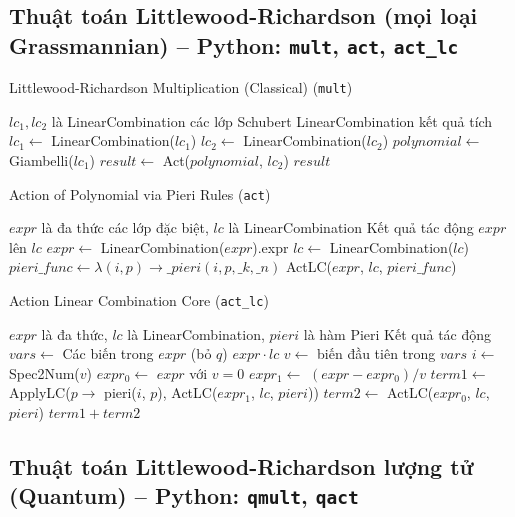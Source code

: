 
\subsection*{Thuật toán Littlewood-Richardson (mọi loại Grassmannian) -- Python: \texttt{mult}, \texttt{act}, \texttt{act\_lc}}

\begin{algorithm}[H]
\caption{Littlewood-Richardson Multiplication (Classical) (\texttt{mult})}
\begin{algorithmic}[1]
\REQUIRE $lc_1, lc_2$ là LinearCombination các lớp Schubert
\ENSURE LinearCombination kết quả tích
\STATE $lc_1 \gets$ LinearCombination($lc_1$)
\STATE $lc_2 \gets$ LinearCombination($lc_2$)
\STATE $polynomial \gets$ Giambelli($lc_1$)
\STATE $result \gets$ Act($polynomial$, $lc_2$)
\RETURN $result$
\end{algorithmic}
\end{algorithm}

\begin{algorithm}[H]
\caption{Action of Polynomial via Pieri Rules (\texttt{act})}
\begin{algorithmic}[1]
\REQUIRE $expr$ là đa thức các lớp đặc biệt, $lc$ là LinearCombination
\ENSURE Kết quả tác động $expr$ lên $lc$
\STATE $expr \gets$ LinearCombination($expr$).expr
\STATE $lc \gets$ LinearCombination($lc$)
\STATE $pieri\_func \gets \lambda(i,p) \to \_pieri(i, p, \_k, \_n)$
\RETURN ActLC($expr$, $lc$, $pieri\_func$)
\end{algorithmic}
\end{algorithm}

\begin{algorithm}[H]
\caption{Action Linear Combination Core (\texttt{act\_lc})}
\begin{algorithmic}[1]
\REQUIRE $expr$ là đa thức, $lc$ là LinearCombination, $pieri$ là hàm Pieri
\ENSURE Kết quả tác động
\STATE $vars \gets$ Các biến trong $expr$ (bỏ $q$)
    \RETURN $expr \cdot lc$
\ENDIF
\STATE $v \gets$ biến đầu tiên trong $vars$
\STATE $i \gets$ Spec2Num($v$)
\STATE $expr_0 \gets$ $expr$ với $v=0$
\STATE $expr_1 \gets$ $(expr - expr_0)/v$
\STATE $term1 \gets$ ApplyLC($p \to$ pieri($i$, $p$), ActLC($expr_1$, $lc$, $pieri$))
\STATE $term2 \gets$ ActLC($expr_0$, $lc$, $pieri$)
\RETURN $term1 + term2$
\end{algorithmic}
\end{algorithm}

\subsection*{Thuật toán Littlewood-Richardson lượng tử (Quantum) -- Python: \texttt{qmult}, \texttt{qact}}

